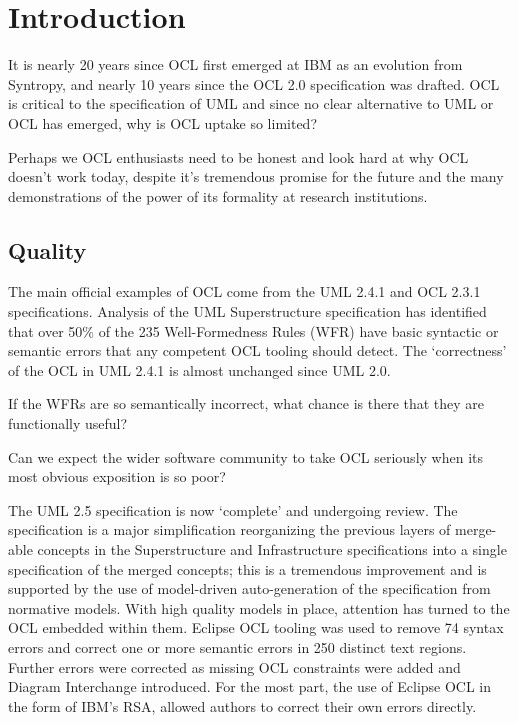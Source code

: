 \documentclass{acm_proc_article-sp}
\begin{document}



\section{Introduction}
It is nearly 20 years since OCL first emerged at IBM as an evolution from Syntropy, and nearly 10 years since the OCL 2.0 specification was drafted\cite{OCL-2.0-draft}. OCL is critical to the specification of UML and since no clear alternative to UML or OCL has emerged,
why is OCL uptake so limited?

Perhaps we OCL enthusiasts need to be honest and look hard at why OCL doesn't work today, despite it's tremendous
promise for the future and the many demonstrations of the power of its formality at research institutions.

\subsection{Quality}

The main official examples of OCL come from the UML 2.4.1\cite{UML-2.4.1-Super} and OCL 2.3.1\cite{OCL-2.3.1} specifications. Analysis\cite{UML-inconsistent} of the UML Superstructure specification has identified that over 50\% of the 235 Well-Formedness Rules (WFR) have basic syntactic or semantic errors
that any competent OCL tooling should detect. The `correctness' of the OCL in UML 2.4.1 is almost unchanged
since UML 2.0.

If the WFRs are so semantically incorrect, what chance is there that they are functionally useful?

Can we expect the wider software community to take OCL seriously when its most obvious exposition is so poor?

The UML 2.5 specification is now `complete' and undergoing review. The specification is a major simplification
reorganizing the previous layers of merge-able concepts in the Superstructure and Infrastructure specifications into
a single specification of the merged concepts; this is a tremendous improvement and is supported by the use of
model-driven auto-generation of the specification from normative models. With high quality models in place, attention has
turned to the OCL embedded within them. Eclipse OCL\cite{MDT/OCL} tooling was used to remove 74 syntax errors and correct one or more semantic errors in 250 distinct text regions. Further errors were corrected as missing OCL constraints were added and Diagram Interchange introduced.
For the most part, the use of Eclipse OCL in the form of IBM's RSA, allowed authors to correct their own errors directly.
\end{document}
